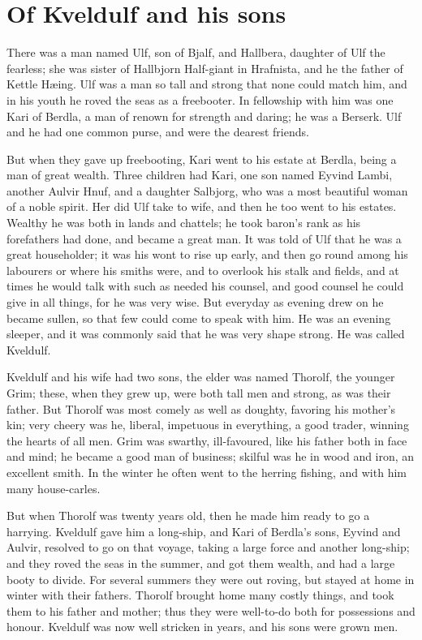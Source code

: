 \chapter{Of Kveldulf and his sons}
There was a man named Ulf, son of Bjalf, and Hallbera, daughter of Ulf the fearless; she was sister of Hallbjorn Half-giant in Hrafnista, and he the father of Kettle H\ae ing. Ulf was a man so tall and strong that none could match him, and in his youth he roved the seas as a freebooter. In fellowship with him was one Kari of Berdla, a man of renown for strength and daring; he was a Berserk. Ulf and he had one common purse, and were the dearest friends.

But when they gave up freebooting, Kari went to his estate at Berdla, being a man of great wealth. Three children had Kari, one son named Eyvind Lambi, another Aulvir Hnuf, and a daughter Salbjorg, who was a most beautiful woman of a noble spirit. Her did Ulf take to wife, and then he too went to his estates. Wealthy he was both in lands and chattels; he took baron's rank as his forefathers had done, and became a great man. It was told of Ulf that he was a great householder; it was his wont to rise up early, and then go round among his labourers or where his smiths were, and to overlook his stalk and fields, and at times he would talk with such as needed his counsel, and good counsel he could give in all things, for he was very wise. But everyday as evening drew on he became sullen, so that few could come to speak with him. He was an evening sleeper, and it was commonly said that he was very shape strong. He was called Kveldulf.

Kveldulf and his wife had two sons, the elder was named Thorolf, the younger Grim; these, when they grew up, were both tall men and strong, as was their father. But Thorolf was most comely as well as doughty, favoring his mother's kin; very cheery was he, liberal, impetuous in everything, a good trader, winning the hearts of all men. Grim was swarthy, ill-favoured, like his father both in face and mind; he became a good man of business; skilful was he in wood and iron, an excellent smith. In the winter he often went to the herring fishing, and with him many house-carles.

But when Thorolf was twenty years old, then he made him ready to go a harrying. Kveldulf gave him a long-ship, and Kari of Berdla's sons, Eyvind and Aulvir, resolved to go on that voyage, taking a large force and another long-ship; and they roved the seas in the summer, and got them wealth, and had a large booty to divide. For several summers they were out roving, but stayed at home in winter with their fathers. Thorolf brought home many costly things, and took them to his father and mother; thus they were well-to-do both for possessions and honour. Kveldulf was now well stricken in years, and his sons were grown men.
